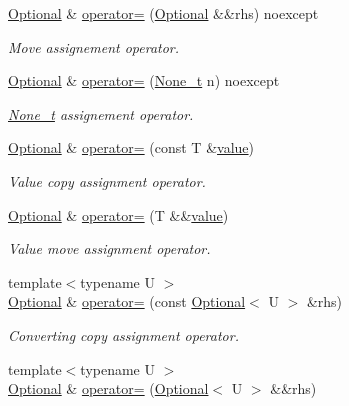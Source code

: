 \begin{DoxyCompactItemize}
\hyperlink{classmcurses_1_1Optional}{Optional} \& \hyperlink{classmcurses_1_1Optional_aae2fb9089d2d969590c3d666339cb1a4}{operator=} (\hyperlink{classmcurses_1_1Optional}{Optional} \&\&rhs) noexcept
\begin{DoxyCompactList}\small\item\em Move assignement operator. \end{DoxyCompactList}\item 
\hyperlink{classmcurses_1_1Optional}{Optional} \& \hyperlink{classmcurses_1_1Optional_a5d3515e3b7ce25aa5f5f5d4c08c1b35e}{operator=} (\hyperlink{classmcurses_1_1None__t}{None\+\_\+t} n) noexcept
\begin{DoxyCompactList}\small\item\em \hyperlink{classmcurses_1_1None__t}{None\+\_\+t} assignement operator. \end{DoxyCompactList}\item 
\hyperlink{classmcurses_1_1Optional}{Optional} \& \hyperlink{classmcurses_1_1Optional_ac77b0ca69b51f7d176983812d95c0807}{operator=} (const T \&\hyperlink{classmcurses_1_1Optional_ad366988d0311c9f6d4de369f222f248f}{value})
\begin{DoxyCompactList}\small\item\em Value copy assignment operator. \end{DoxyCompactList}\item 
\hyperlink{classmcurses_1_1Optional}{Optional} \& \hyperlink{classmcurses_1_1Optional_a023f00ae051bce4f61885e8bbfd14106}{operator=} (T \&\&\hyperlink{classmcurses_1_1Optional_ad366988d0311c9f6d4de369f222f248f}{value})
\begin{DoxyCompactList}\small\item\em Value move assignment operator. \end{DoxyCompactList}\item 
{\footnotesize template$<$typename U $>$ }\\\hyperlink{classmcurses_1_1Optional}{Optional} \& \hyperlink{classmcurses_1_1Optional_a3cb153eb9365b4fc64616d7505465ed8}{operator=} (const \hyperlink{classmcurses_1_1Optional}{Optional}$<$ U $>$ \&rhs)
\begin{DoxyCompactList}\small\item\em Converting copy assignment operator. \end{DoxyCompactList}\item 
{\footnotesize template$<$typename U $>$ }\\\hyperlink{classmcurses_1_1Optional}{Optional} \& \hyperlink{classmcurses_1_1Optional_a08e3433ed663644a0f6f7148197df952}{operator=} (\hyperlink{classmcurses_1_1Optional}{Optional}$<$ U $>$ \&\&rhs)

\end{DoxyCompactItemize}
